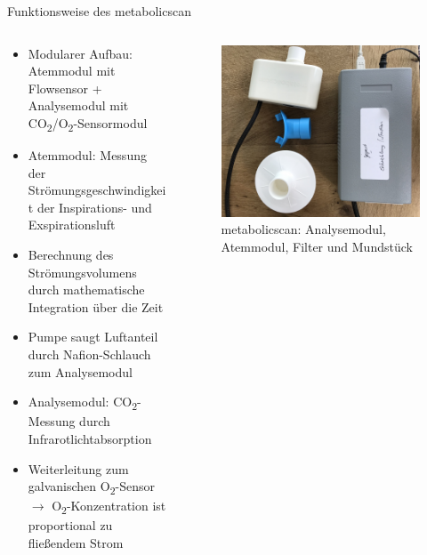 \documentclass[colorBG,slideColor,8pt]{beamer}
\begin{document}
\begin{frame}{Funktionsweise des metabolicscan}
\begin{columns}
\begin{column}{0.5\linewidth}
\begin{itemize}
	\item Modularer Aufbau: Atemmodul mit Flowsensor + Analysemodul mit CO\textsubscript{2}/O\textsubscript{2}-Sensormodul
	\item Atemmodul: Messung der Strömungsgeschwindigkeit der Inspirations- und Exspirationsluft
	\item Berechnung des Strömungsvolumens durch mathematische Integration über die Zeit
	\item Pumpe saugt Luftanteil durch Nafion-Schlauch zum Analysemodul
	\item Analysemodul: CO\textsubscript{2}-Messung durch Infrarotlichtabsorption
	\item Weiterleitung zum galvanischen O\textsubscript{2}-Sensor $\rightarrow$ O\textsubscript{2}-Konzentration ist proportional zu fließendem Strom
\end{itemize}
\end{column}
\begin{column}{0.5\linewidth}
			\begin{figure}[H]
				\centering
				\includegraphics[width=0.8\linewidth]{Bilder/mbs.jpg}
				\caption{metabolicscan: Analysemodul, Atemmodul, Filter und Mundstück}
			\end{figure}
\end{column}
\end{columns}
\end{frame}
\end{document}
